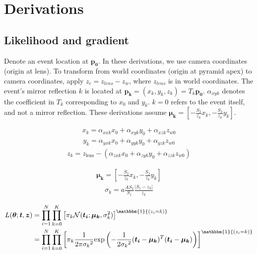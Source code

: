 
\clearpage
\setcounter{page}{1}
\maketitlesupplementary


\section{Derivations}
\subsection{Likelihood and gradient} \label{sec:like}

Denote an event location at $\bm{p_0}$.
In these derivations, we use camera coordinates (origin at lens). 
To transform from world coordinates (origin at pyramid apex) to camera 
coordinates, apply $z_c = z_{lens} - z_w$, where $z_{lens}$ is in world coordinates.
The event's mirror reflection $k$ is located at $\bm{p_k}=(x_k,y_k,z_k)=T_k\bm{p_0}$.
$\alpha_{xyk}$ denotes the coefficient in $T_k$ corresponding to $x_0$ and $y_k$.
$k=0$ refers to the event itself, and not a mirror reflection.
These derivations assume $\bm{\mu_k} = \left[-\frac{S_2}{z_k} x_k, -\frac{S_2}{z_k} y_k\right]$. 

\begin{align}
x_k = \alpha_{xxk}x_0 + \alpha_{xyk}y_0 + \alpha_{xzk}z_{w0}
\end{align}
\begin{align}
y_k = \alpha_{yxk}x_0 + \alpha_{yyk}y_0 + \alpha_{yzk}z_{w0}
\end{align}
\begin{align}
z_k = z_\text{lens} - (\alpha_{zxk}x_0 + \alpha_{zyk}y_0 + \alpha_{zzk}z_{w0})
\end{align}


\begin{align}
\bm{\mu_k} = \left[-\frac{S_2}{z_k} x_k, -\frac{S_2}{z_k} y_k\right]
\end{align}
\begin{align}
\sigma_k = a \frac{AS_2}{S_1} \frac{|S_1-z_k|}{z_k}
\end{align}


\begin{align}
L(\bm{\theta};\bm{t},\bm{z}) &= \prod_{i=1}^N \prod_{k=0}^K \left[ \pi_k \mathcal{N}(\bm{t_i};\bm{\mu_k},\sigma_k^2) \right]^{\mathbbm{1}{(z_i=k)}} \\
&= \prod_{i=1}^N \prod_{k=0}^K \left[ \pi_k \frac{1}{2\pi{\sigma_k}^2} \text{exp}\left( -\frac{1}{2{\sigma_k}^2} (\bm{t_i}-\bm{\mu_k})^T(\bm{t_i}-\bm{\mu_k}) \right) \right]^{\mathbbm{1}{(z_i=k)}}
\end{align}

